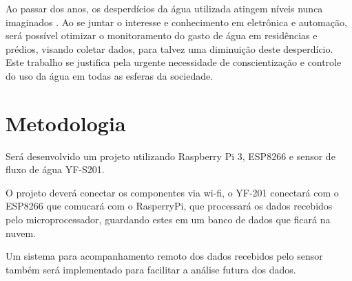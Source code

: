 Ao passar dos anos, os desperdícios da água utilizada atingem níveis nunca imaginados \cite{rebouccas2003agua}. Ao se juntar o interesse e conhecimento em eletrônica e automação, será possível otimizar o monitoramento do gasto de água em residências e prédios, visando coletar dados, para talvez uma diminuição deste desperdício. Este trabalho se justifica pela urgente necessidade de conscientização e controle do uso da água em todas as esferas da sociedade. 
%
\section{Metodologia}

Será desenvolvido um projeto utilizando Raspberry Pi 3, ESP8266 e sensor de fluxo de água YF-S201.

O projeto deverá conectar os componentes via wi-fi, o YF-201 conectará com o ESP8266 que comucará com o RasperryPi, que processará os dados recebidos pelo microprocessador, guardando estes em um banco de dados que ficará na nuvem.

Um sistema para acompanhamento remoto dos dados recebidos pelo sensor também será implementado para facilitar a análise futura dos dados.
